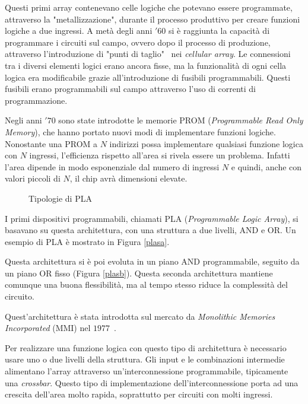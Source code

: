 Questi primi array contenevano celle logiche che potevano essere programmate, attraverso la "metallizzazione", durante il processo produttivo per creare funzioni logiche a due ingressi. A metà degli anni $'60$ si è raggiunta la capacità di programmare i circuiti sul campo, ovvero dopo il processo di produzione, attraverso l'introduzione di "punti di taglio"~\cite{Minnick:1967:SMR:321386.321387} nei \textit{cellular array}. Le connessioni tra i diversi elementi logici erano ancora fisse, ma la funzionalità di ogni cella logica era modificabile grazie all'introduzione di fusibili programmabili. Questi fusibili erano programmabili sul campo attraverso l'uso di correnti di programmazione.

Negli anni $'70$ sono state introdotte le memorie PROM (\textit{Programmable Read Only Memory}), che hanno portato nuovi modi di implementare funzioni logiche. Nonostante una PROM a $N$ indirizzi possa implementare qualsiasi funzione logica con $N$ ingressi, l'efficienza rispetto all'area si rivela essere un problema. Infatti l'area dipende in modo esponenziale dal numero di ingressi $N$ e quindi, anche con valori piccoli di $N$, il chip avrà dimensioni elevate.

\begin{figure}
\centering
{}
\hspace{5mm}
\caption{Tipologie di PLA}\label{plas}
\end{figure}

I primi dispositivi programmabili, chiamati PLA (\textit{Programmable Logic Array}), si basavano su questa architettura, con una struttura a due livelli, AND e OR. Un esempio di PLA è mostrato in Figura \ref{plasa}.

Questa architettura si è poi evoluta in un piano AND programmabile, seguito da un piano OR fisso (Figura \ref{plasb}). Questa seconda architettura mantiene comunque una buona flessibilità, ma al tempo stesso riduce la complessità del circuito.

Quest'architettura è stata introdotta sul mercato da \textit{Monolithic Memories Incorporated} (MMI) nel $1977$~\cite{birkner1978programmable}.

Per realizzare una funzione logica con questo tipo di architettura è necessario usare uno o due livelli della struttura. Gli input e le combinazioni intermedie alimentano l'array attraverso un'interconnessione programmabile, tipicamente una \textit{crossbar}. Questo tipo di implementazione dell'interconnessione porta ad una crescita dell'area molto rapida, soprattutto per circuiti con molti ingressi.

